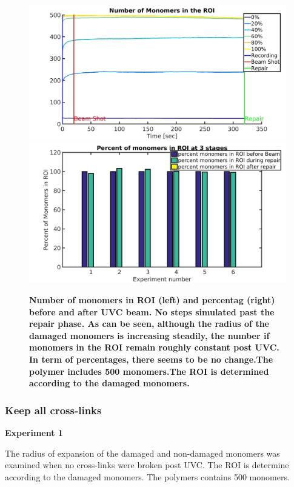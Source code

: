 \documentclass[12pt]{report}
\begin{document}
	\begin{figure}
	\includegraphics[width=0.5\linewidth, height=0.3\textheight]{Images/expandAffected/BreakAffectedCrosslinks/meanNumMonomersInROI}
	\includegraphics[width=0.5\linewidth, height=0.3\textheight]{Images/expandAffected/BreakAffectedCrosslinks/percentMonomersInROI}
	\caption{\tiny{\textbf{Number of monomers in ROI (left) and percentag (right) before and after UVC beam. No steps simulated past the repair phase. As can be seen, although the radius of the damaged monomers is increasing steadily, the number if monomers in the ROI remain roughly constant post UVC. In term of percentages, there seems to be no change.The polymer includes 500 monomers.The ROI is determined according to the damaged monomers.}}}
	\label{fig:meanNumMonomersInROI}
	\end{figure}
		
	
	\subsubsection{Keep all cross-links}
      \textbf{Experiment 1}
      
	   The radius of expansion of the damaged and non-damaged monomers was examined when no cross-links were broken post UVC. The ROI is determine according to the damaged monomers. The polymers contains 500 monomers. 
		     		     
\end{document}
